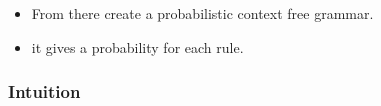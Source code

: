 \documentclass[11pt]{article}
\begin{document}
\begin{minipage}[l]{.5\linewidth}
    \begin{figure}[H]
        \centering
    \end{figure}    
\end{minipage}\hfill
\begin{minipage}[r]{.48\linewidth}
    \begin{itemize}
        \item From there create a probabilistic context free grammar.
        \item it gives a probability for each rule.
    \end{itemize}
\end{minipage}

\subsubsection{Intuition}
\end{document}
